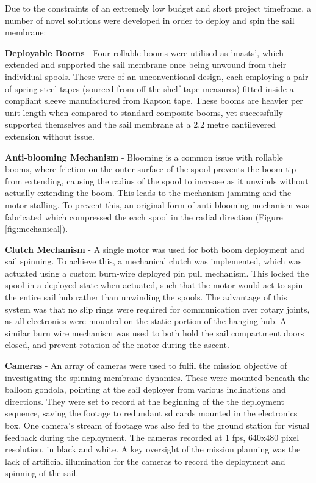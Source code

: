 \documentclass[final,3p,times,twocolumn]{elsarticle}
\begin{document}
\vspace{5pt}
\par\noindent Due to the constraints of an extremely low budget and short project timeframe, a number of novel solutions were developed in order to deploy and spin the sail membrane:

\vspace{5pt}
\par\noindent \textbf{Deployable Booms} - Four rollable booms were utilised as 'masts', which extended and supported the sail membrane once being unwound from their individual spools. These were of an unconventional design, each employing a pair of spring steel tapes (sourced from off the shelf tape measures) fitted inside a compliant sleeve manufactured from Kapton tape. These booms are heavier per unit length when compared to standard composite booms, yet successfully supported themselves and the sail membrane at a 2.2 metre cantilevered extension without issue.

\vspace{2pt}
\par\noindent\textbf{Anti-blooming Mechanism} - Blooming is a common issue with rollable booms, where friction on the outer surface of the spool prevents the boom tip from extending, causing the radius of the spool to increase as it unwinds without actually extending the boom. This leads to the mechanism jamming and the motor stalling. To prevent this, an original form of anti-blooming mechanism was fabricated which compressed the each spool in the radial direction (Figure \ref{fig:mechanical}).

\vspace{2pt}
\par\noindent\textbf{Clutch Mechanism} - A single motor was used for both boom deployment and sail spinning. To achieve this, a mechanical clutch was implemented, which was actuated using a custom burn-wire deployed pin pull mechanism. This locked the spool in a deployed state when actuated, such that the motor would act to spin the entire sail hub rather than unwinding the spools. The advantage of this system was that no slip rings were required for communication over rotary joints, as all electronics were mounted on the static portion of the hanging hub. A similar burn wire mechanism was used to both hold the sail compartment doors closed, and prevent rotation of the motor during the ascent.

\vspace{2pt}
\par\noindent\textbf{Cameras} - An array of cameras were used to fulfil the mission objective of investigating the spinning membrane dynamics. These were mounted beneath the balloon gondola, pointing at the sail deployer from various inclinations and directions. They were set to record at the beginning of the the deployment sequence, saving the footage to redundant sd cards mounted in the electronics box. One camera's stream of footage was also fed to the ground station for visual feedback during the deployment. The cameras recorded at 1 fps, 640x480 pixel resolution, in black and white. A key oversight of the mission planning was the lack of artificial illumination for the cameras to record the deployment and spinning of the sail.
\end{document}
